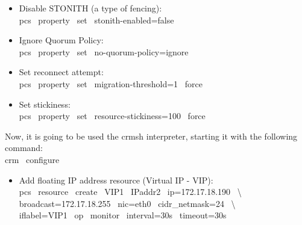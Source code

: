 \documentclass[a4paper, 12pt]{book}
\begin{document}
\begin{itemize}
	\item Disable STONITH (a type of fencing):\\
		pcs \ property \ set \ stonith-enabled=false\\
\end{itemize}


\begin{itemize}
	\item Ignore Quorum Policy:\\
		pcs \ property \ set \ no-quorum-policy=ignore\\
\end{itemize}


\begin{itemize}
	\item Set reconnect attempt:\\
		pcs \ property \ set \ migration-threshold=1 \ \textminus \textminus force\\
\end{itemize}


\begin{itemize}
	\item Set stickiness:\\
		pcs \ property \ set \ resource-stickiness=100 \ \textminus \textminus force\\
\end{itemize}

\noindent Now, it is going to be used the crmsh interpreter, starting it with the following command:\\
	crm \ configure

\begin{itemize}
	\item Add floating IP address resource (Virtual IP - VIP):\\
		pcs \ resource \ create \ VIP1 \ IPaddr2 \ ip=172.17.18.190 \ \textbackslash \\
			broadcast=172.17.18.255 \ nic=eth0 \ cidr\_netmask=24 \ \textbackslash \\
			iflabel=VIP1 \ op \ monitor \ interval=30s \ timeout=30s
\end{itemize}
\end{document}
